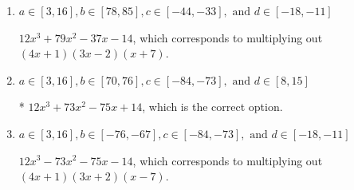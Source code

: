 \documentclass{extbook}[14pt]
\begin{document}
\begin{enumerate}
{\begin{enumerate}[label=\Alph*.]
$12x^{3} +95 x^{2} +79 x + 14$, which corresponds to multiplying out $(4x + 1)(3x + 2)(x + 7)$.
\item \( a \in [3, 16], b \in [78, 85], c \in [-44, -33], \text{ and } d \in [-18, -11] \)

$12x^{3} +79 x^{2} -37 x -14$, which corresponds to multiplying out $(4x + 1)(3x -2)(x + 7)$.
\item \( a \in [3, 16], b \in [70, 76], c \in [-84, -73], \text{ and } d \in [8, 15] \)

* $12x^{3} +73 x^{2} -75 x + 14$, which is the correct option.
\item \( a \in [3, 16], b \in [-76, -67], c \in [-84, -73], \text{ and } d \in [-18, -11] \)

$12x^{3} -73 x^{2} -75 x -14$, which corresponds to multiplying out $(4x + 1)(3x + 2)(x -7)$.
\end{enumerate}

}
\end{enumerate}
\end{document}
